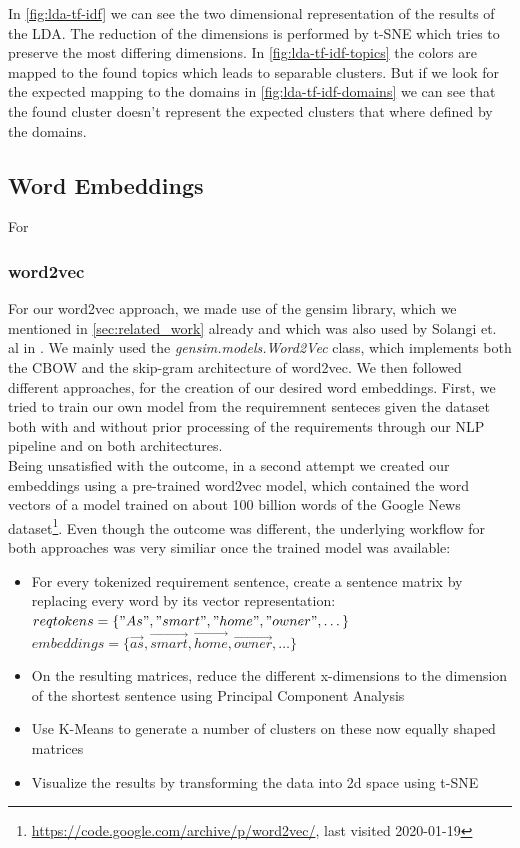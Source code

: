 In \autoref{fig:lda-tf-idf} we can see the two dimensional representation of the results of the LDA. The reduction of the dimensions is performed by t-SNE which tries to preserve the most differing dimensions. In \autoref{fig:lda-tf-idf-topics} the colors are mapped to the found topics which leads to separable clusters. But if we look for the expected mapping to the domains in \autoref{fig:lda-tf-idf-domains} we can see that the found cluster doesn't represent the expected clusters that where defined by the domains.

\subsection{Word Embeddings}
For 

\subsubsection{word2vec} %
\label{sub:own_word2vec}
For our word2vec approach, we made use of the gensim library, which we mentioned in \autoref{sec:related_work} already and which was also used by Solangi et. al in \cite{solangi_review_2018}. We mainly used the \emph{gensim.models.Word2Vec} class, which implements both the CBOW and the skip-gram architecture of word2vec. We then followed different approaches, for the creation of our desired word embeddings. First, we tried to train our own model from the requiremnent senteces given the \crowdre{} dataset both with and without prior processing of the requirements through our NLP pipeline and on both architectures.\\
Being unsatisfied with the outcome, in a second attempt we created our embeddings using a pre-trained word2vec model, which contained the word vectors of a model trained on about 100 billion words of the Google News dataset\footnote{\url{https://code.google.com/archive/p/word2vec/}, last visited 2020-01-19}. Even though the outcome was different, the underlying workflow for both approaches was very similiar once the trained model was available:
\begin{itemize}
	\item For every tokenized requirement sentence, create a sentence matrix by replacing every word by its vector representation:\\
	$reqtokens = \{"As", "smart", "home", "owner", \dots\}$\\
	$embeddings = \{ \vec{as}, \vec{smart}, \vec{home}, \vec{owner}, \dots \}$
	\item On the resulting matrices, reduce the different x-dimensions to the dimension of the shortest sentence using Principal Component Analysis
	\item Use K-Means to generate a number of clusters on these now equally shaped matrices
	\item Visualize the results by transforming the data into 2d space using t-SNE\cite{maaten_visualizing_2008}
\end{itemize}


